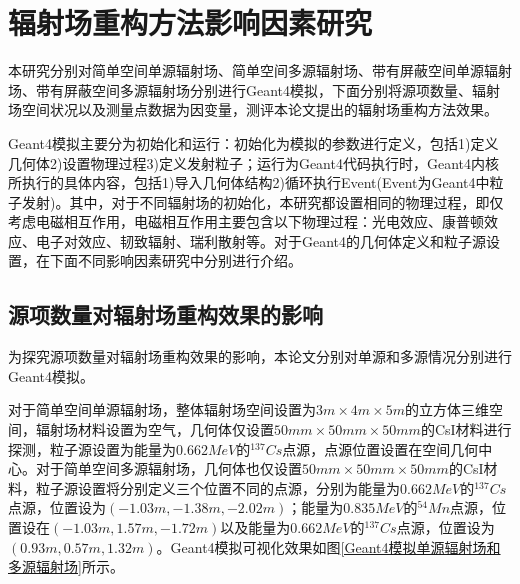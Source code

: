 \section{辐射场重构方法影响因素研究}
本研究分别对简单空间单源辐射场、简单空间多源辐射场、带有屏蔽空间单源辐射场、带有屏蔽空间多源辐射场分别进行Geant4模拟，下面分别将源项数量、辐射场空间状况以及测量点数据为因变量，测评本论文提出的辐射场重构方法效果。

Geant4模拟主要分为初始化和运行：初始化为模拟的参数进行定义，包括1)定义几何体2)设置物理过程3)定义发射粒子；运行为Geant4代码执行时，Geant4内核所执行的具体内容，包括1)导入几何体结构2)循环执行Event(Event为Geant4中粒子发射)。其中，对于不同辐射场的初始化，本研究都设置相同的物理过程，即仅考虑电磁相互作用，电磁相互作用主要包含以下物理过程：光电效应、康普顿效应、电子对效应、韧致辐射、瑞利散射等。对于Geant4的几何体定义和粒子源设置，在下面不同影响因素研究中分别进行介绍。

\subsection{源项数量对辐射场重构效果的影响}
为探究源项数量对辐射场重构效果的影响，本论文分别对单源和多源情况分别进行Geant4模拟。

对于简单空间单源辐射场，整体辐射场空间设置为$ 3m \times 4m \times 5m $的立方体三维空间，辐射场材料设置为空气，几何体仅设置$ 50mm \times 50mm \times 50mm $的CsI材料进行探测，粒子源设置为能量为$0.662MeV$的$ ^{137}Cs $点源，点源位置设置在空间几何中心。对于简单空间多源辐射场，几何体也仅设置$ 50mm \times 50mm \times 50mm $的CsI材料，粒子源设置将分别定义三个位置不同的点源，分别为能量为$ 0.662MeV $的$ ^{137}Cs $点源，位置设为$ (-1.03m, -1.38m, -2.02m) $；能量为$ 0.835MeV $的$ ^{54}Mn $点源，位置设在$ (-1.03m, 1.57m, -1.72m) $以及能量为$ 0.662MeV $的$ ^{137}Cs $点源，位置设为$ (0.93m, 0.57m, 1.32m) $。Geant4模拟可视化效果如图\ref{Geant4模拟单源辐射场和多源辐射场}所示。

